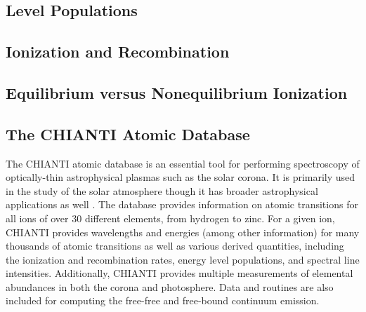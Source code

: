 
\subsection{Level Populations}\label{subsec:level_pops}


\subsection{Ionization and Recombination}\label{subsec:ionization_recombination}

\subsection{Equilibrium versus Nonequilibrium Ionization}\label{subsec:ioneq_versus_nei}

\subsection{The CHIANTI Atomic Database}\label{subsec:chianti}

The CHIANTI atomic database \citep{dere_chianti_1997,young_chianti_1998,landi_chianti_1999,dere_chianti-atomic_2001,landi_chianti-atomic_2002,young_chianti-atomic_2003,landi_chianti-atomic_2006,landi_chianti-atomic_2006-1,dere_chianti_2009,landi_chiantiatomic_2009,young_chiantiatomic_2009,landi_chiantiatomic_2012,landi_chiantiatomic_2013,del_zanna_chianti_2015,young_chianti_2016} is an essential tool for performing spectroscopy of optically-thin astrophysical plasmas such as the solar corona. It is primarily used in the study of the solar atmosphere though it has broader astrophysical applications as well \citep[see Figure 4 of][]{young_chianti_2016}. The database provides information on atomic transitions for all ions of over 30 different elements, from hydrogen to zinc. For a given ion, CHIANTI provides wavelengths and energies (among other information) for many thousands of atomic transitions as well as various derived quantities, including the ionization and recombination rates, energy level populations, and spectral line intensities. Additionally, CHIANTI provides multiple measurements of elemental abundances in both the corona and photosphere. Data and routines are also included for computing the free-free and free-bound continuum emission. 

